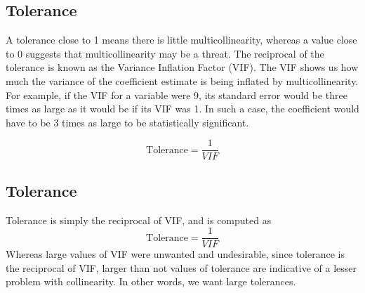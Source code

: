 \documentclass[a4paper,12pt]{article}
\begin{document}






\subsection{Tolerance}
A tolerance close to 1 means there is little multicollinearity, whereas a value close to 0 suggests that multicollinearity may be a threat. The reciprocal of the tolerance is known as the Variance Inflation Factor (VIF). The VIF shows us how much the variance of the coefficient estimate is being inflated by multicollinearity. For example, if the VIF for a variable were 9, its standard error would be three times as large as it would be if its VIF was 1. In such a case, the coefficient would have to be 3 times as large to be statistically significant.

\[ \mbox{Tolerance} = \frac{1}{VIF}\]



\subsection{Tolerance}

Tolerance is simply the reciprocal of VIF, and is computed as
\[ \mbox{Tolerance} = \frac{1}{VIF}\]
Whereas large values of VIF were unwanted and undesirable, since tolerance is the reciprocal of VIF, larger than not values of tolerance are indicative of a lesser problem with collinearity. In other words, we want large tolerances.
\end{document}
